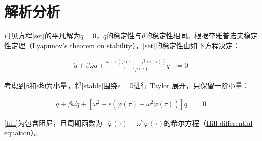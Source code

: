 \section{解析分析}

可见方程\eqref{set}的平凡解为$q=0$，$q$的稳定性与$\theta$的稳定性相同。根据李雅普诺夫稳定性定理（\href{https://en.wikipedia.org/wiki/Lyapunov_stability}{Lyapunov's theorem on stability}）\cite{belyakov_nonlinear_2009}，\eqref{set}的稳定性由如下方程决定：

\begin{align}
    \ddot{q}+\beta\omega\dot{q}+\frac{\omega-\epsilon(\ddot{\varphi}(\tau)+\beta\omega\dot{\varphi}(\tau))}{1+\epsilon\varphi(\tau)}q &= 0 \label{stable}
\end{align}

考虑到$\beta$和$\epsilon$均为小量，将\eqref{stable}围绕$\epsilon=0$进行 Taylor 展开，只保留一阶小量：

\begin{align}
    \ddot{q}+\beta\omega\dot{q}+\left[\omega^{2}-\epsilon\left(\ddot{\varphi}(\tau)+\omega^{2}\varphi(\tau)\right)\right]q &=0 \label{hill}
\end{align}

\eqref{hill}为包含阻尼，且周期函数为$-\ddot{\varphi}(\tau)-\omega^{2}\varphi(\tau)$的希尔方程（\href{https://en.wikipedia.org/wiki/Hill_differential_equation}{Hill differential equation}）。